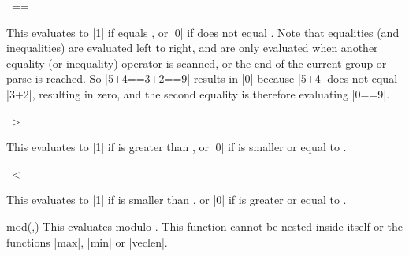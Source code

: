\begin{math-operator}{\ ==\ } 

	This evaluates to |1| if  equals , or |0| if 
	does not equal . 
	Note that equalities (and inequalities) are evaluated left to right, 
	and are only evaluated when another equality (or inequality) operator 
	is scanned, or the end of the current group or parse is reached. So 
	|5+4==3+2==9| results in |0| because |5+4| does not equal |3+2|, 
	resulting in zero, and the second equality is therefore evaluating 
	|0==9|.

\begin{codeexample}[post=\tt\footnotesize\pgfmathresult]
\end{codeexample}

\end{math-operator}


\begin{math-operator}{\ >\ } 

	This evaluates to |1| if  is greater than , or |0| if 
	 is smaller or equal to .
	
\begin{codeexample}[post=\tt\footnotesize\pgfmathresult]
\end{codeexample}

\end{math-operator}

\begin{math-operator}{\ <\ }

	This evaluates to |1| if  is smaller than , or |0| if
	 is greater or equal to .
	
\begin{codeexample}[post=\tt\footnotesize\pgfmathresult]
\end{codeexample}

\end{math-operator}

\begin{math-function}{mod(,)}
	This evaluates  modulo . This function cannot be 
	nested inside itself or the functions |max|, |min| or |veclen|.

\begin{codeexample}[post=\tt\footnotesize\pgfmathresult]
\end{codeexample}

\end{math-function}

